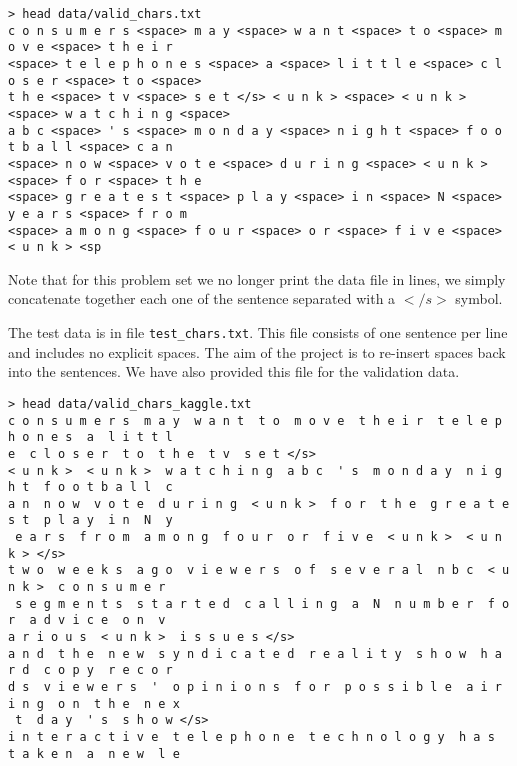 \documentclass[11pt]{article}
\begin{document}
\begin{lstlisting}
> head data/valid_chars.txt 
c o n s u m e r s <space> m a y <space> w a n t <space> t o <space> m o v e <space> t h e i r
<space> t e l e p h o n e s <space> a <space> l i t t l e <space> c l o s e r <space> t o <space> 
t h e <space> t v <space> s e t </s> < u n k > <space> < u n k > <space> w a t c h i n g <space> 
a b c <space> ' s <space> m o n d a y <space> n i g h t <space> f o o t b a l l <space> c a n 
<space> n o w <space> v o t e <space> d u r i n g <space> < u n k > <space> f o r <space> t h e 
<space> g r e a t e s t <space> p l a y <space> i n <space> N <space> y e a r s <space> f r o m 
<space> a m o n g <space> f o u r <space> o r <space> f i v e <space> < u n k > <sp
\end{lstlisting}

Note that for this problem set we no longer print the data file in lines, we 
simply concatenate together each one of the sentence separated with a $</s>$
symbol. 


The test data is in file \texttt{test\_chars.txt}. This file consists 
of one sentence per line and includes no explicit spaces. The aim of 
the project is to re-insert spaces back into the sentences. We have 
also provided this file for the validation data.

\begin{lstlisting}
> head data/valid_chars_kaggle.txt 
c o n s u m e r s  m a y  w a n t  t o  m o v e  t h e i r  t e l e p h o n e s  a  l i t t l 
e  c l o s e r  t o  t h e  t v  s e t </s>                                                  
< u n k >  < u n k >  w a t c h i n g  a b c  ' s  m o n d a y  n i g h t  f o o t b a l l  c 
a n  n o w  v o t e  d u r i n g  < u n k >  f o r  t h e  g r e a t e s t  p l a y  i n  N  y
 e a r s  f r o m  a m o n g  f o u r  o r  f i v e  < u n k >  < u n k > </s>               
t w o  w e e k s  a g o  v i e w e r s  o f  s e v e r a l  n b c  < u n k >  c o n s u m e r 
 s e g m e n t s  s t a r t e d  c a l l i n g  a  N  n u m b e r  f o r  a d v i c e  o n  v 
a r i o u s  < u n k >  i s s u e s </s>                                                     
a n d  t h e  n e w  s y n d i c a t e d  r e a l i t y  s h o w  h a r d  c o p y  r e c o r 
d s  v i e w e r s  '  o p i n i o n s  f o r  p o s s i b l e  a i r i n g  o n  t h e  n e x
 t  d a y  ' s  s h o w </s>                                                                 
i n t e r a c t i v e  t e l e p h o n e  t e c h n o l o g y  h a s  t a k e n  a  n e w  l e
\end{lstlisting}
\end{document}
